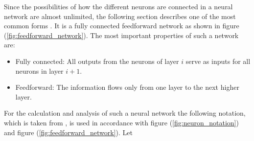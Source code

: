 Since the possibilities of how the different neurons are connected in a neural network are almost unlimited, the following section describes one of the most common forms \cite{kriesel}. It is a fully connected feedforward network as shown in figure (\ref{fig:feedforward_network}). The most important properties of such a network are:

\begin{itemize}
	\item Fully connected: All outputs from the neurons of layer $i$ serve as inputs for all neurons in layer $i+1$.
	\item Feedforward: The information flows only from one layer to the next higher layer. 
\end{itemize}

For the calculation and analysis of such a neural network the following notation, which is taken from \cite{Mar_Pri}, is used in accordance with figure (\ref{fig:neuron_notation}) and figure (\ref{fig:feedforward_network}). Let


